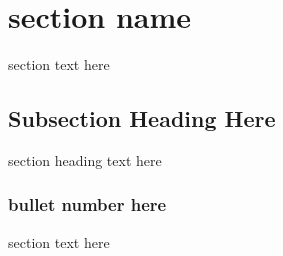 \section{ section name }
section text here

\subsection{Subsection Heading Here}
section heading text here

\subsubsection{bullet number here}
section text here 